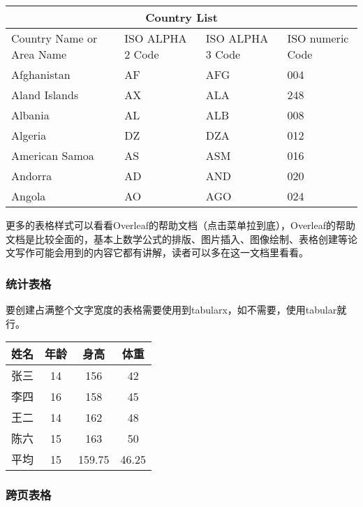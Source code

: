 \begin{table}[!htb]
\centering
{}
\label{tab:5}
\begin{tabular}{ |p{3cm}||p{3cm}|p{3cm}|p{3cm}| }
 \hline
 \multicolumn{4}{|c|}{Country List} \\
 \hline
Country Name or Area Name& ISO ALPHA 2 Code & ISO ALPHA 3 Code & ISO numeric Code \\
 \hline
 Afghanistan   & AF    &AFG&   004\\
 Aland Islands&   AX  & ALA   &248\\
 Albania &AL & ALB&  008\\
 Algeria    &DZ & DZA&  012\\
 American Samoa&   AS  & ASM&016\\
 Andorra& AD  & AND   &020\\
 Angola& AO  & AGO&024\\
 \hline
\end{tabular}
\end{table}

更多的表格样式可以看看Overleaf的帮助文档（点击菜单拉到底），Overleaf的帮助文档是比较全面的，基本上数学公式的排版、图片插入、图像绘制、表格创建等论文写作可能会用到的内容它都有讲解，读者可以多在这一文档里看看。

\subsubsection{统计表格}

要创建占满整个文字宽度的表格需要使用到tabularx，如不需要，使用tabular就行。

\begin{table}[!htb]
  \centering
  \label{tab:6}
  \begin{tabularx}{\textwidth}{CCCC}
    \toprule
    姓名&年龄&身高&体重\\
    \midrule
    张三&14&156&42\\
    李四&16&158&45\\
    王二&14&162&48\\
    陈六&15&163&50\\
    平均&15&159.75&46.25\\
    \bottomrule
  \end{tabularx}
\end{table}

\subsubsection{跨页表格}

